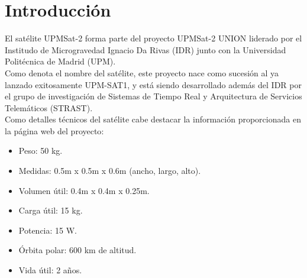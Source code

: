 
\chapter{Introducción}
\label{chap:introduccion}

El satélite UPMSat-2 forma parte del proyecto UPMSat-2 UNION liderado por el
Institudo de Microgravedad Ignacio Da Rivas (IDR) junto con la Universidad
Politécnica de Madrid (UPM).\\

Como denota el nombre del satélite, este proyecto nace como sucesión al
ya lanzado exitosamente UPM-SAT1, y está siendo desarrollado además del IDR por
el grupo de investigación de Sistemas de Tiempo Real y Arquitectura de Servicios
Telemáticos (STRAST\cite{web-strast}).\\

Como detalles técnicos del satélite cabe destacar la información proporcionada
en la página web del proyecto\cite{web-upmsat2}:
\begin{itemize}
\item Peso: 50 kg.
\item Medidas: 0.5m x 0.5m x 0.6m (ancho, largo, alto).
\item Volumen útil: 0.4m x 0.4m x 0.25m.
\item Carga útil: 15 kg.
\item Potencia: 15 W.
\item Órbita polar: 600 km de altitud.
\item Vida útil: 2 años.
\end{itemize}

